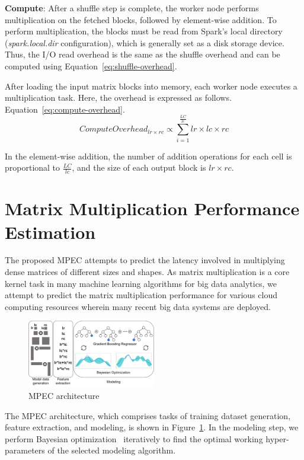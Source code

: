 \documentclass[10pt, conference, compsocconf]{IEEEtran}
\begin{document}
\textbf{Compute}: After a shuffle step is complete, the worker node performs multiplication on the fetched blocks, followed by element-wise addition. To perform multiplication, the blocks must be read from Spark's local directory (\textit{spark.local.dir} configuration), which is generally set as a disk storage device. Thus, the I/O read overhead is the same as the shuffle overhead and can be computed using Equation~\ref{eq:shuffle-overhead}.

After loading the input matrix blocks into memory, each worker node executes a multiplication task. Here, the overhead is expressed as follows. Equation~\ref{eq:compute-overhead}.
\begin{equation}\label{eq:compute-overhead}
  ComputeOverhead_{lr \times rc} \propto \sum\limits_{i=1}^{\frac{LC}{lc}} lr \times lc \times rc
\end{equation}

In the element-wise addition, the number of addition operations for each cell is proportional to $\frac{LC}{lc}$, and the size of each output block is $lr \times rc$.

\section{Matrix Multiplication Performance Estimation}\label{sec:mpc-structure}The proposed MPEC attempts to predict the latency involved in multiplying dense matrices of different sizes and shapes. As matrix multiplication is a core kernel task in many machine learning algorithms for big data analytics, we attempt to predict the matrix multiplication performance for various cloud computing resources wherein many recent big data systems are deployed.
\begin{figure}
  \centering\includegraphics[width=0.5\textwidth]{figures/mpc-architecture.pdf}\caption{MPEC architecture}\label{fig:mpc-architecture}
\end{figure}

The MPEC architecture, which comprises tasks of training dataset generation, feature extraction, and modeling, is shown in Figure~\ref{fig:mpc-architecture}. In the modeling step, we perform Bayesian optimization~\cite{bayesian-optimization} iteratively to find the optimal working hyper-parameters of the selected modeling algorithm.
\end{document}
